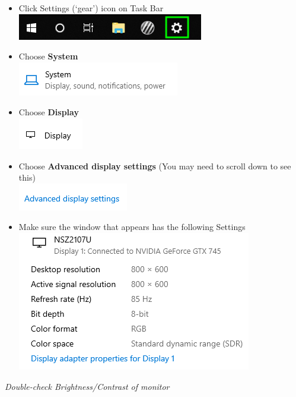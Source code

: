 \documentclass[]{article}
\providecommand{\tightlist}{%
  \setlength{\itemsep}{0pt}\setlength{\parskip}{0pt}}
\begin{document}
  \begin{itemize}
  \tightlist
  \item
    Click Settings (`gear') icon on Task Bar
    \includegraphics{images/DispSettings-1.PNG}\\
  \item
    Choose \textbf{System}\\
    \includegraphics{images/DS2.PNG}\\
  \item
    Choose \textbf{Display}\\
    \includegraphics{images/ds3.PNG}\\
  \item
    Choose \textbf{Advanced display settings} (You may need to scroll
    down to see this)\\
    \includegraphics{images/DS4.PNG}\\
  \item
    Make sure the window that appears has the following Settings\\
    \includegraphics{images/ds5.PNG}\\
  \end{itemize}
\item
  \emph{Double-check Brightness/Contrast of monitor}
\end{document}
